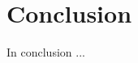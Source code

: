 \documentclass{scrartcl}
\begin{document}




\section{Conclusion}
In conclusion ...
	


	
\end{document}
